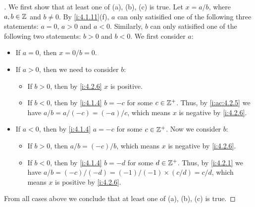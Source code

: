 \begin{proof}[]
  We first show that at least one of (a), (b), (c) is true.
  Let \(x = a / b\), where \(a, b \in \mathbb{Z}\) and \(b \neq 0\).
  By \cref{i:4.1.11}(f), \(a\) can only satisified one of the following three statements:
  \(a = 0\), \(a > 0\) and \(a < 0\).
  Similarly, \(b\) can only satisified one of the following two statements:
  \(b > 0\) and \(b < 0\).
  We first consider \(a\):
  \begin{itemize}
    \item If \(a = 0\), then \(x = 0 / b = 0\).
    \item If \(a > 0\), then we need to consider \(b\):
          \begin{itemize}
            \item If \(b > 0\), then by \cref{i:4.2.6} \(x\) is positive.
            \item If \(b < 0\), then by \cref{i:4.1.4} \(b = -c\) for some \(c \in \mathbb{Z}^+\).
                  Thus, by \cref{i:ac:4.2.5} we have \(a / b = a / (-c) = (-a) / c\), which means \(x\) is negative by \cref{i:4.2.6}.
          \end{itemize}
    \item If \(a < 0\), then by \cref{i:4.1.4} \(a = -c\) for some \(c \in \mathbb{Z}^+\).
          Now we consider \(b\):
          \begin{itemize}
            \item If \(b > 0\), then \(a / b = (-c) / b\), which means \(x\) is negative by \cref{i:4.2.6}.
            \item If \(b < 0\), then by \cref{i:4.1.4} \(b = -d\) for some \(d \in \mathbb{Z}^+\).
                  Thus, by \cref{i:4.2.1} we have \(a / b = (-c) / (-d) = (-1) / (-1) \times (c / d) = c / d\), which means \(x\) is positive by \cref{i:4.2.6}.
          \end{itemize}
  \end{itemize}
  From all cases above we conclude that at least one of (a), (b), (c) is true.


\end{proof}
